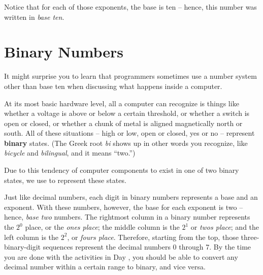 Notice that for each of those exponents, the base is ten -- hence, this number was written in \textit{base ten}.

\section{Binary Numbers}
    
It might surprise you to learn that programmers sometimes use a number system other than base ten when discussing what happens inside a computer.

At its most basic hardware level, all a computer can recognize is things like whether a voltage is above or below a certain threshold, or whether a switch is open or closed, or whether a chunk of metal is aligned magnetically north or south.  All of these situations -- high or low, open or closed, yes or no -- represent \textbf{binary} states.  (The Greek root \textit{bi} shows up in other words you recognize, like \textit{bicycle} and \textit{bilingual}, and it means ``two.'')

Due to this tendency of computer components to exist in one of two binary states, we use  to represent these states.

Just like decimal numbers, each digit in binary numbers represents a base and an exponent.  With these numbers, however, the base for each exponent is two -- hence, \textit{base two} numbers.  The rightmost column in a binary number represents the $2^0$ place, or the \textit{ones place}; the middle column is the $2^1$ or \textit{twos place}; and the left column is the $2^2$, or \textit{fours place}.  Therefore, starting from the top, those three-binary-digit sequences represent the decimal numbers 0 through 7.  By the time you are done with the activities in Day \thechapter, you should be able to convert any decimal number within a certain range to binary, and vice versa.